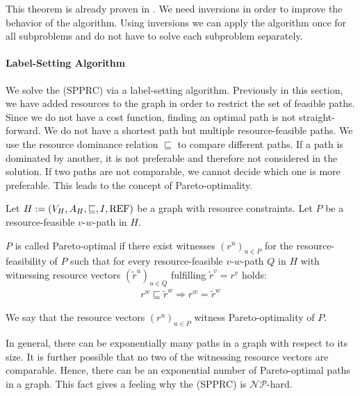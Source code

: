 This theorem is already proven in \cite[p.~83]{Kaiser}. We need inversions in order to improve the behavior of the algorithm. Using inversions we can apply the algorithm once for all subproblems and do not have to solve each subproblem separately.

\paragraph{Label-Setting Algorithm} \parfill

We solve the (SPPRC) via a label-setting algorithm. Previously in this section, we have added resources to the graph in order to restrict the set of feasible paths. Since we do not have a cost function, finding an optimal path is not straight-forward. We do not have a shortest path but multiple resource-feasible paths. We use the resource dominance relation $\sqsubseteq$ to compare different paths. If a path is dominated by another, it is not preferable and therefore not considered in the solution. If two paths are not comparable, we cannot decide which one is more preferable. This leads to the concept of Pareto-optimality.

\begin{definition}

Let ${H:=\left(V_H,A_H,\sqsubseteq,I,\operatorname{REF}\right)}$ be a graph with resource constraints. Let $P$ be a resource-feasible $v$-$w$-path in $H$.

$P$ is called Pareto-optimal if there exist witnesses $\left(r^u\right)_{u\in P}$ for the resource-feasibility of $P$ such that for every resource-feasible $v$-$w$-path $Q$ in $H$ with witnessing resource vectors $\left(\tilde{r}^u\right)_{u\in Q}$ fulfilling ${\tilde{r}^v = r^v}$ holds:
\begin{align*}
	r^w\sqsubseteq \tilde{r}^w \Rightarrow r^w = \tilde{r}^w
\end{align*}

We say that the resource vectors $\left(r^u\right)_{u\in P}$ witness Pareto-optimality of $P$.

\end{definition}

In general, there can be exponentially many paths in a graph with respect to its size. It is further possible that no two of the witnessing resource vectors are comparable. Hence, there can be an exponential number of Pareto-optimal paths in a graph. This fact gives a feeling why the (SPPRC) is $\mathcal{NP}$-hard.

